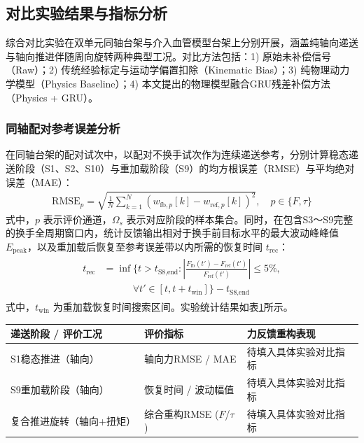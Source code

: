 \documentclass{JQRnew}
\begin{document}
\subsection{对比实验结果与指标分析}

综合对比实验在双单元同轴台架与介入血管模型台架上分别开展，涵盖纯轴向递送与轴向推进伴随周向旋转两种典型工况。对比方法包括：1) 原始未补偿信号（Raw）；2) 传统经验标定与运动学偏置扣除（Kinematic Bias）；3) 纯物理动力学模型（Physics Baseline）；4) 本文提出的物理模型融合GRU残差补偿方法（Physics + GRU）。

\subsubsection{同轴配对参考误差分析}

在同轴台架的配对试次中，以配对不换手试次作为连续递送参考，分别计算稳态递送阶段（S1、S2、S10）与重加载阶段（S9）的均方根误差（RMSE）与平均绝对误差（MAE）：
\begin{align}
	\label{eq17}
	\text{RMSE}_p = \sqrt{\frac{1}{N}\sum_{k=1}^N (w_{\text{fb},p}[k] - w_{\text{ref},p}[k])^2},\quad p \in \{F,\tau\}
\end{align}
式中，$p$ 表示评价通道，$\Omega_s$ 表示对应阶段的样本集合。同时，在包含S3～S9完整的换手全周期窗口内，统计反馈输出相对于换手前目标水平的最大波动峰峰值 $E_{\text{peak}}$，以及重加载后恢复至参考误差带以内所需的恢复时间 $t_{\text{rec}}$：
\begin{align}
	\label{eq18}
	\begin{aligned}
		t_{\text{rec}} &= \inf \Big\{ t > t_{\text{S8,end}} : \left|\frac{F_{\text{fb}}(t') - F_{\text{ref}}(t')}{F_{\text{ref}}(t')}\right| \le 5\%, \\
		&\qquad\quad \forall t' \in [t, t+t_{\text{win}}] \Big\} - t_{\text{S8,end}}
	\end{aligned}
\end{align}
式中，$t_{\text{win}}$ 为重加载恢复时间搜索区间。实验统计结果如表\ref{tab1}所示。

\begin{table}[h!t]
	\centering
	\label{tab1}
	\begin{tabular}{lll}
		\toprule
		递送阶段 / 评价工况 & 评价指标 & 力反馈重构表现 \\
		\midrule
		S1稳态推进（轴向） & 轴向力RMSE / MAE & 待填入具体实验对比指标 \\
		S9重加载阶段（轴向） & 恢复时间 / 波动幅值 & 待填入具体实验对比指标 \\
		复合推进旋转（轴向+扭矩） & 综合重构RMSE ($F$/$\tau$) & 待填入具体实验对比指标 \\
		\bottomrule
	\end{tabular}
\end{table}
\end{document}
